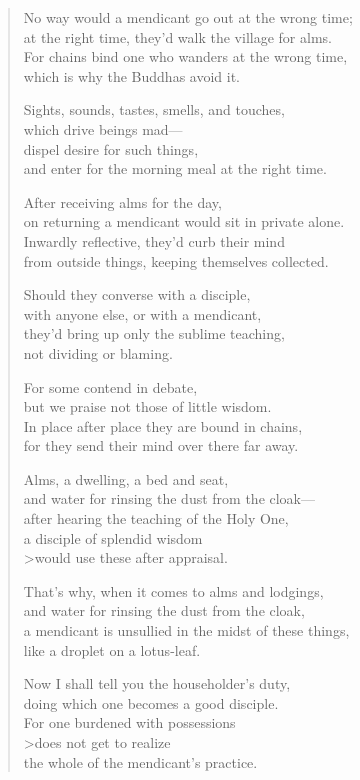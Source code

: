 \documentclass[12pt,openany]{book}%
\begin{document}
\begin{verse}
No way would a mendicant go out at the wrong time; \\
at the right time, they’d walk the village for alms. \\
For chains bind one who wanders at the wrong time, \\
which is why the Buddhas avoid it. 

Sights, sounds, tastes, smells, and touches, \\
which drive beings mad—\\
dispel desire for such things, \\
and enter for the morning meal at the right time. 

After receiving alms for the day, \\
on returning a mendicant would sit in private alone. \\
Inwardly reflective, they’d curb their mind \\
from outside things, keeping themselves collected. 

Should they converse with a disciple, \\
with anyone else, or with a mendicant, \\
they’d bring up only the sublime teaching, \\
not dividing or blaming. 

For some contend in debate, \\
but we praise not those of little wisdom. \\
In place after place they are bound in chains, \\
for they send their mind over there far away. 

Alms, a dwelling, a bed and seat, \\
and water for rinsing the dust from the cloak—\\
after hearing the teaching of the Holy One, \\
a disciple of splendid wisdom \\>would use these after appraisal. 

That’s why, when it comes to alms and lodgings, \\
and water for rinsing the dust from the cloak, \\
a mendicant is unsullied in the midst of these things, \\
like a droplet on a lotus-leaf. 

Now I shall tell you the householder’s duty, \\
doing which one becomes a good disciple. \\
For one burdened with possessions \\>does not get to realize \\
the whole of the mendicant’s practice. 


\end{verse}
\end{document}
